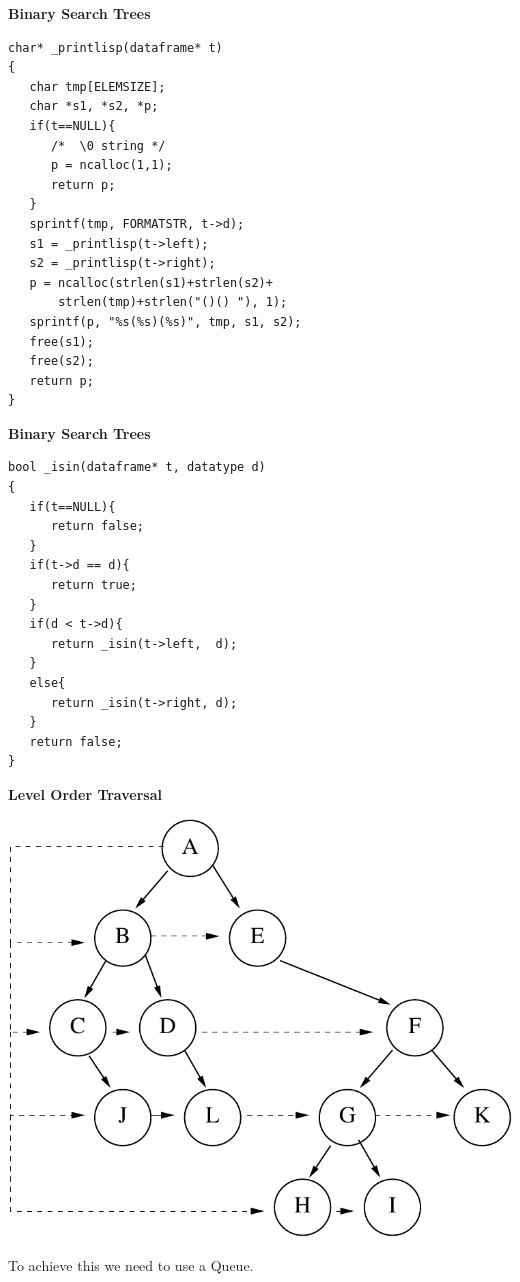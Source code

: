 \newpage	
{\samepage	
\begin{center}	
{\Large{\bf Binary Search Trees}}	
\end{center}	
\begin{verbatim}	
char* _printlisp(dataframe* t)	
{	
   char tmp[ELEMSIZE];	
   char *s1, *s2, *p;	
   if(t==NULL){	
      /*  \0 string */	
      p = ncalloc(1,1);	
      return p;	
   }	
   sprintf(tmp, FORMATSTR, t->d);	
   s1 = _printlisp(t->left);	
   s2 = _printlisp(t->right);	
   p = ncalloc(strlen(s1)+strlen(s2)+
       strlen(tmp)+strlen("()() "), 1);	
   sprintf(p, "%s(%s)(%s)", tmp, s1, s2);	
   free(s1);	
   free(s2);	
   return p;	
}	
\end{verbatim}	

\newpage	
{\samepage	
\begin{center}	
{\Large{\bf Binary Search Trees}}	
\end{center}	
\begin{verbatim}	
bool _isin(dataframe* t, datatype d)
{
   if(t==NULL){
      return false;
   }
   if(t->d == d){
      return true;
   }
   if(d < t->d){
      return _isin(t->left,  d);
   }
   else{
      return _isin(t->right, d);
   }
   return false;
}
\end{verbatim}	
}	

\newpage	
{\samepage	
\begin{center}	
{\Large{\bf Level Order Traversal}}	
\end{center}	
\begin{center}	
\includegraphics{../Images/treelvl.pdf}	
\end{center}	
To achieve this we need to use a Queue.	
}	

}

